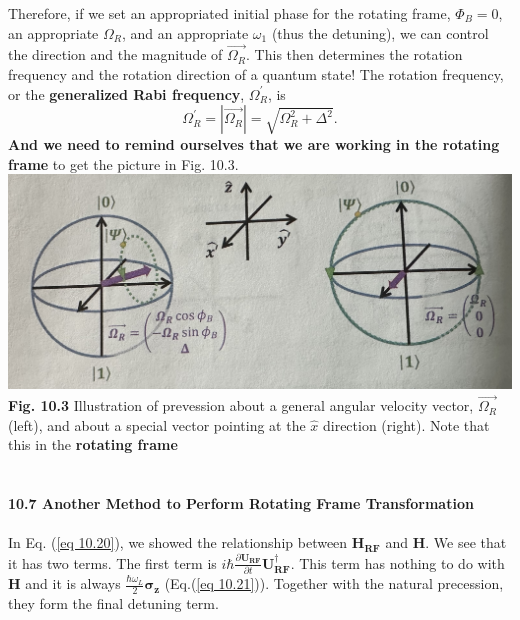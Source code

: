 \documentclass{article}
\begin{document}
Therefore, if we set an appropriated initial phase for the rotating frame, $\varPhi_B=0$, an
appropriate $\varOmega_R$, and an appropriate $\omega_1$ (thus the detuning), we can control the
direction and the magnitude of $\vec{\varOmega_R}$. This then determines the rotation frequency and
the rotation direction of a quantum state! The rotation frequency, or the \textbf{generalized Rabi frequency},
$\varOmega_R^\prime$, is 
\begin{equation}\label{eq 10.31}
    \varOmega_R^\prime=|\vec{\varOmega_R}|=\sqrt{\varOmega_R^2+\varDelta^2}.\tag{10.31}
\end{equation}
\textbf{And we need to remind ourselves that we are working in the rotating frame} to get the picture in Fig. 10.3.\\

\includegraphics[scale=0.5]{Fig. 10.3.jpeg}\\
\textbf{Fig. 10.3} Illustration of prevession about a general angular velocity vector, $\vec{\varOmega_R}$
(left), and about a special vector pointing at the $\hat{x}$ direction (right). Note that this in the \textbf{rotating frame}\\\\\\
\textbf{\large 10.7 Another Method to Perform Rotating Frame Transformation}\\\\
In Eq. (\ref{eq 10.20}), we showed the relationship between $\boldsymbol{H_{RF}}$ and $\boldsymbol{H}$. We see that it has
two terms. The first term is $i\hbar\frac{\partial \boldsymbol{U_{RF}}}{\partial t}\boldsymbol{U}^\dagger_{\boldsymbol{RF}}$.
This term has nothing to do with $\boldsymbol{H}$ and it is always $\frac{\hbar\omega_L}{2}\boldsymbol{\sigma_z}$ (Eq.(\ref{eq 10.21})).
Together with the natural precession, they form the final detuning term.
\end{document}
